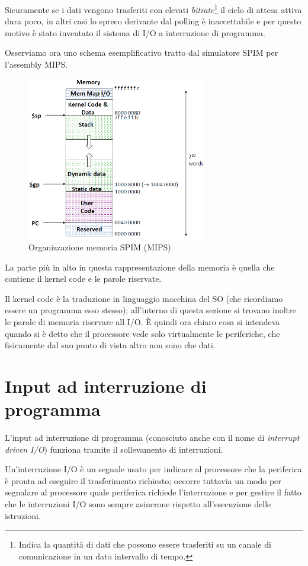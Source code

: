 \documentclass[class=book, crop=false, oneside]{standalone}
\begin{document}
Sicuramente se i dati vengono trasferiti con elevati \emph{bitrate}\footnote{Indica la quantità di dati che possono essere trasferiti su un canale di comunicazione in un dato intervallo di tempo.} il ciclo di attesa attiva dura poco, in altri casi lo spreco derivante dal polling è inaccettabile e per questo motivo è stato inventato il sistema di I/O a interruzione di programma.

Osserviamo ora uno schema esemplificativo tratto dal simulatore SPIM per l'assembly MIPS.
\begin{figure}[!h]
	\centering
	\includegraphics[width=0.7\textwidth,keepaspectratio]{SPIM}
	\caption{Organizzazione memoria SPIM (MIPS)}
\end{figure}
La parte più in alto in questa rappresentazione della memoria è quella che contiene il kernel code e le parole riservate.

Il kernel code è la traduzione in linguaggio macchina del SO (che ricordiamo essere un programma esso stesso); all'interno di questa sezione si trovano inoltre le parole di memoria riservare all I/O. È quindi ora chiaro cosa si intendeva quando si è detto che il processore vede solo virtualmente le periferiche, che fisicamente dal suo punto di vista altro non sono che dati.

\section{Input ad interruzione di programma}
L'input ad interruzione di programma (conosciuto anche con il nome di \emph{interrupt driven I/O}) funziona tramite il sollevamento di interruzioni.

Un'interruzione I/O è un segnale usato per indicare al processore che la periferica è pronta ad eseguire il trasferimento richiesto;
occorre tuttavia un modo per segnalare al processore quale periferica richiede l'interruzione e per gestire il fatto che le interruzioni I/O sono sempre asincrone rispetto all'esecuzione delle istruzioni.
\end{document}
